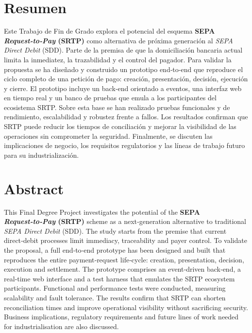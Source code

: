 {}

\thispagestyle{empty}

\section*{Resumen}
Este Trabajo de Fin de Grado explora el potencial del esquema \textbf{SEPA\cite{ecb_sepa} \textit{Request‑to‑Pay} (SRTP)} como alternativa de próxima generación al \emph{SEPA Direct Debit} (SDD). Parte de la premisa de que la domiciliación bancaria actual limita la inmediatez, la trazabilidad y el control del pagador. Para validar la propuesta se ha diseñado y construido un prototipo end‑to‑end que reproduce el ciclo completo de una petición de pago: creación, presentación, decisión, ejecución y cierre. El prototipo incluye un back‑end orientado a eventos, una interfaz web en tiempo real y un banco de pruebas que emula a los participantes del ecosistema SRTP. Sobre esta base se han realizado pruebas funcionales y de rendimiento, escalabilidad y robustez frente a fallos. Los resultados confirman que SRTP puede reducir los tiempos de conciliación y mejorar la visibilidad de las operaciones sin comprometer la seguridad. Finalmente, se discuten las implicaciones de negocio, los requisitos regulatorios y las líneas de trabajo futuro para su industrialización.

\newpage

\section*{Abstract}
This Final Degree Project investigates the potential of the \textbf{SEPA\cite{ecb_sepa} \textit{Request‑to‑Pay} (SRTP)} scheme as a next‑generation alternative to traditional \emph{SEPA Direct Debit} (SDD). The study starts from the premise that current direct‑debit processes limit immediacy, traceability and payer control. To validate the proposal, a full end‑to‑end prototype has been designed and built that reproduces the entire payment‑request life‑cycle: creation, presentation, decision, execution and settlement. The prototype comprises an event‑driven back‑end, a real‑time web interface and a test harness that emulates the SRTP ecosystem participants. Functional and performance tests were conducted, measuring scalability and fault tolerance. The results confirm that SRTP can shorten reconciliation times and improve operational visibility without sacrificing security. Business implications, regulatory requirements and future lines of work needed for industrialisation are also discussed.

